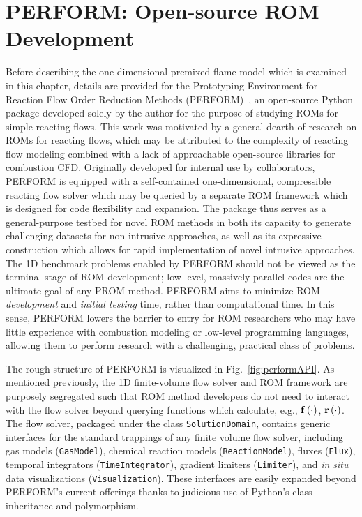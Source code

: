 \section{PERFORM: Open-source ROM Development}

Before describing the one-dimensional premixed flame model which is examined in this chapter, details are provided for the Prototyping Environment for Reaction Flow Order Reduction Methods (PERFORM)~\cite{Wentland2022}, an open-source Python package developed solely by the author for the purpose of studying ROMs for simple reacting flows. This work was motivated by a general dearth of research on ROMs for reacting flows, which may be attributed to the complexity of reacting flow modeling combined with a lack of approachable open-source libraries for combustion CFD. Originally developed for internal use by collaborators, PERFORM is equipped with a self-contained one-dimensional, compressible reacting flow solver which may be queried by a separate ROM framework which is designed for code flexibility and expansion. The package thus serves as a general-purpose testbed for novel ROM methods in both its capacity to generate challenging datasets for non-intrusive approaches, as well as its expressive construction which allows for rapid implementation of novel intrusive approaches. The 1D benchmark problems enabled by PERFORM should not be viewed as the terminal stage of ROM development; low-level, massively parallel codes are the ultimate goal of any PROM method. PERFORM aims to minimize ROM \textit{development} and \textit{initial testing} time, rather than computational time. In this sense, PERFORM lowers the barrier to entry for ROM researchers who may have little experience with combustion modeling or low-level programming languages, allowing them to perform research with a challenging, practical class of problems.

The rough structure of PERFORM is visualized in Fig.~\ref{fig:performAPI}. As mentioned previously, the 1D finite-volume flow solver and ROM framework are purposely segregated such that ROM method developers do not need to interact with the flow solver beyond querying functions which calculate, e.g., $\mathbf{f} \left(\cdot\right)$, $\mathbf{r}\left(\cdot\right)$. The flow solver, packaged under the class \texttt{SolutionDomain}, contains generic interfaces for the standard trappings of any finite volume flow solver, including gas models (\texttt{GasModel}), chemical reaction models (\texttt{ReactionModel}), fluxes (\texttt{Flux}), temporal integrators (\texttt{TimeIntegrator}), gradient limiters (\texttt{Limiter}), and \textit{in situ} data visualizations (\texttt{Visualization}). These interfaces are easily expanded beyond PERFORM's current offerings thanks to judicious use of Python's class inheritance and polymorphism.

